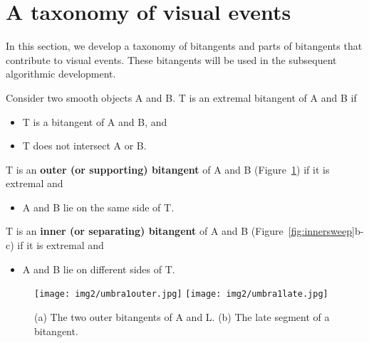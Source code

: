 \documentclass[9pt,twocolumn]{article}
\newif\ifJournal
\begin{document}



\ifJournal
Bitangents are required throughout the paper, since they define umbral boundaries.
We have developed efficient algorithms for computing bitangents
using intersection in dual space \cite{jj01}.
\fi



\section{A taxonomy of visual events}
\label{sec:terms}

In this section, we develop a taxonomy of bitangents and parts of bitangents
that contribute to visual events.
These bitangents will be used in the subsequent algorithmic development.

\begin{defn2}
\label{defn:outerbitang}
Consider two smooth objects A and B.
T is an extremal bitangent of A and B if
\begin{itemize}
\item T is a bitangent of A and B, and
\item T does not intersect A or B.
\end{itemize} 
T is an {\bf outer (or supporting) bitangent} of A and B (Figure~\ref{fig:outer}) if it is extremal and 
\begin{itemize}
\item A and B lie on the same side of T.
\end{itemize}
T is an {\bf inner (or separating) bitangent} of A and B (Figure~\ref{fig:innersweep}b-c) if it is extremal and
\begin{itemize}
\item A and B lie on different sides of T.
\end{itemize}
\end{defn2}

\begin{figure}
\begin{center}
\texttt{[image: img2/umbra1outer.jpg]}
\texttt{[image: img2/umbra1late.jpg]}
\end{center}
\caption{(a) The two outer bitangents of A and L. (b) The late segment of a bitangent.}
\label{fig:outer}
\end{figure}
\end{document}
